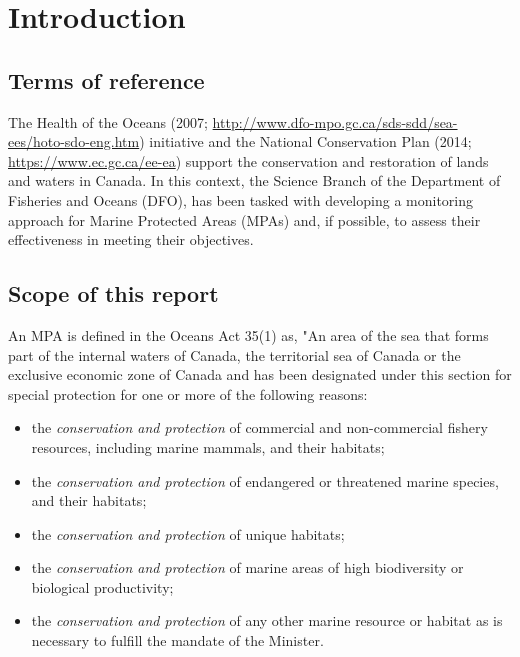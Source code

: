 \documentclass[letterpaper,portrait,11pt]{scrartcl}
\numberwithin{equation}{section}    %
\numberwithin{figure}{section}    %
\numberwithin{table}{section}       %
\begin{document}

\newpage
{}
\setcounter{page}{1}

\section{Introduction}

\subsection{Terms of reference}
The Health of the Oceans (2007; \url{http://www.dfo-mpo.gc.ca/sds-sdd/sea-ees/hoto-sdo-eng.htm}) initiative and the National Conservation Plan (2014; \url{https://www.ec.gc.ca/ee-ea}) support the conservation and restoration of lands and waters in Canada. In this context, the Science Branch of the Department of Fisheries and Oceans (DFO), has been tasked with developing a monitoring approach for Marine Protected Areas (MPAs) and, if possible, to assess their effectiveness in meeting their objectives.

\subsection{Scope of this report}
An MPA is defined in the Oceans Act 35(1) as, "An area of the sea that forms part of the internal waters of Canada, the territorial sea of Canada or the exclusive economic zone of Canada and has been designated under this section for special protection for one or more of the following reasons:

\begin{itemize}
  \item the \textit{conservation and protection} of commercial and non-commercial fishery resources, including marine mammals, and their habitats;
  \item the \textit{conservation and protection} of endangered or threatened marine species, and their habitats;
  \item the \textit{conservation and protection} of unique habitats;
  \item the \textit{conservation and protection} of marine areas of high biodiversity or biological productivity;
  \item the \textit{conservation and protection} of any other marine resource or habitat as is necessary to fulfill the mandate of the Minister.
\end{itemize}
\end{document}
